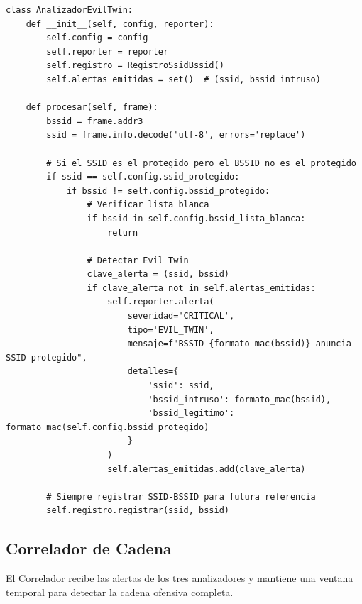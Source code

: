 \documentclass[11pt,a4paper]{article}
\begin{document}
\begin{lstlisting}
class AnalizadorEvilTwin:
    def __init__(self, config, reporter):
        self.config = config
        self.reporter = reporter
        self.registro = RegistroSsidBssid()
        self.alertas_emitidas = set()  # (ssid, bssid_intruso)

    def procesar(self, frame):
        bssid = frame.addr3
        ssid = frame.info.decode('utf-8', errors='replace')

        # Si el SSID es el protegido pero el BSSID no es el protegido
        if ssid == self.config.ssid_protegido:
            if bssid != self.config.bssid_protegido:
                # Verificar lista blanca
                if bssid in self.config.bssid_lista_blanca:
                    return

                # Detectar Evil Twin
                clave_alerta = (ssid, bssid)
                if clave_alerta not in self.alertas_emitidas:
                    self.reporter.alerta(
                        severidad='CRITICAL',
                        tipo='EVIL_TWIN',
                        mensaje=f"BSSID {formato_mac(bssid)} anuncia SSID protegido",
                        detalles={
                            'ssid': ssid,
                            'bssid_intruso': formato_mac(bssid),
                            'bssid_legitimo': formato_mac(self.config.bssid_protegido)
                        }
                    )
                    self.alertas_emitidas.add(clave_alerta)

        # Siempre registrar SSID-BSSID para futura referencia
        self.registro.registrar(ssid, bssid)
\end{lstlisting}

\subsection{Correlador de Cadena}

El Correlador recibe las alertas de los tres analizadores y mantiene una
ventana temporal para detectar la cadena ofensiva completa.
\end{document}
